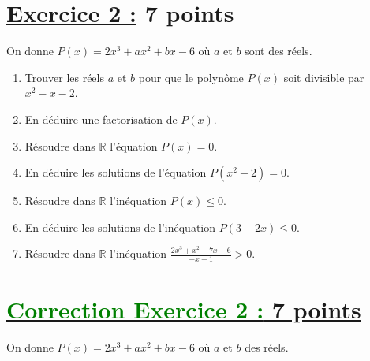 \documentclass[12pt,a4paper]{article}
\begin{document}
\section*{\underline{Exercice 2 :} 7 points}
On donne \( P(x) = 2x^3 + ax^2 + bx - 6 \) où \( a \) et \( b \) sont des réels.
\begin{enumerate}
    \item Trouver les réels \( a \) et \( b \) pour que le polynôme \( P(x) \) soit divisible par \( x^2 - x - 2 \).
    \item En déduire une factorisation de \( P(x) \).
    \item Résoudre dans \( \mathbb{R} \) l'équation \( P(x) = 0 \).
    \item En déduire les solutions de l'équation \( P(x^2 - 2) = 0 \).
    \item Résoudre dans \( \mathbb{R} \) l'inéquation \( P(x) \leq 0 \).
    \item En déduire les solutions de l'inéquation \( P(3 - 2x) \leq 0 \).
    \item Résoudre dans \( \mathbb{R} \) l'inéquation \( \frac{2x^3 + x^2 - 7x - 6}{-x + 1} > 0 \).
\end{enumerate}

\section*{\underline{\textcolor{green}{Correction Exercice 2 :} 7 points}}

On donne \( P(x) = 2x^3 + ax^2 + bx - 6 \) où \( a \) et \( b \) des réels.
\end{document}
